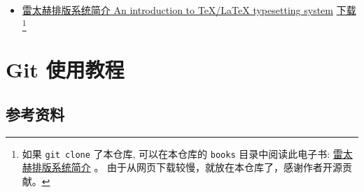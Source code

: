 \documentclass[
    11pt,
    cite=authoryear,
    device=normal,
    lang=cn,
    mode=simple,
    result=answer,
    toc=onecol,
]{elegantbook_sierxue}
\begin{document}
\begin{itemize}
\begin{itemize}
                {一份简短的 LaTeX 数学指南}
                \href{https://wenda.latexstudio.net/article-5006.html}
                {中文下载}
                \footnote{如果 \lstinline{git clone} 了本仓库,
                可以在本仓库的 \lstinline{books}
                目录中阅读此电子书:
                \href{books/short-math-guide(cn).pdf}
                {一份简短的 LaTeX 数学指南} 。
                由于从网页下载较慢，就放在本仓库了，感谢作者开源贡献。}
                \href{http://mirrors.ustc.edu.cn/CTAN/info/short-math-guide/short-math-guide.pdf}{英文下载}
                \footnote{如果 \lstinline{git clone} 了本仓库,
                可以在本仓库的 \lstinline{books}
                目录中阅读此电子书:
                \href{books/short-math-guide.pdf}
                {Short Math Guide for \LaTeX{}} 。
                由于从网页下载较慢，就放在本仓库了，感谢作者开源贡献。}
            \item \href{https://github.com/huangxg/lnotes}
                {雷太赫排版系统简介 An introduction to TeX/LaTeX
                typesetting system}
        \href{https://github.com/huangxg/lnotes/raw/master/lnotes2.pdf}{下载}
                \footnote{如果 \lstinline{git clone} 了本仓库,
                可以在本仓库的 \lstinline{books}
                目录中阅读此电子书:
                \href{books/lnotes2.pdf}{雷太赫排版系统简介} 。
                由于从网页下载较慢，就放在本仓库了，感谢作者开源贡献。}
        \end{itemize}
\end{itemize}



\chapter{Git 使用教程}%
\label{cha:git-tips}

\section{参考资料}%
\label{sec:git-refs}
\end{document}
